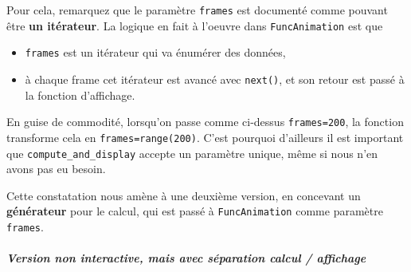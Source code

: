     Pour cela, remarquez que le paramètre \texttt{frames} est documenté
comme pouvant être \textbf{un itérateur}. La logique en fait à l'oeuvre
dans \texttt{FuncAnimation} est que

\begin{itemize}
\tightlist
\item
  \texttt{frames} est un itérateur qui va énumérer des données,
\item
  à chaque frame cet itérateur est avancé avec \texttt{next()}, et son
  retour est passé à la fonction d'affichage.
\end{itemize}

En guise de commodité, lorsqu'on passe comme ci-dessus
\texttt{frames=200}, la fonction transforme cela en
\texttt{frames=range(200)}. C'est pourquoi d'ailleurs il est important
que \texttt{compute\_and\_display} accepte un paramètre unique, même si
nous n'en avons pas eu besoin.

    Cette constatation nous amène à une deuxième version, en concevant un
\textbf{générateur} pour le calcul, qui est passé à
\texttt{FuncAnimation} comme paramètre \texttt{frames}.

    \hypertarget{version-non-interactive-mais-avec-suxe9paration-calcul-affichage}{%
\subparagraph{Version non interactive, mais avec séparation calcul /
affichage}\label{version-non-interactive-mais-avec-suxe9paration-calcul-affichage}}

